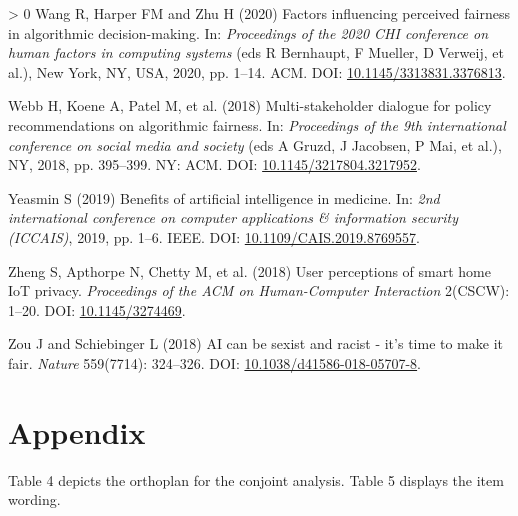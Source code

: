 \documentclass{article}
\newlength{\cslhangindent}
\newenvironment{CSLReferences}[3] %
 {%
  \setlength{\parindent}{0pt}
  \ifodd #1 \everypar{\setlength{\hangindent}{\cslhangindent}}\ignorespaces\fi
  \ifnum #2 > 0
  \setlength{\parskip}{#2\baselineskip}
  \fi
 }%
 {}
\begin{document}
\begin{CSLReferences}{1}{0}
\leavevmode\hypertarget{ref-Wang.2020}{}%
Wang R, Harper FM and Zhu H (2020) Factors influencing perceived
fairness in algorithmic decision-making. In: \emph{Proceedings of the
2020 CHI conference on human factors in computing systems} (eds R
Bernhaupt, F Mueller, D Verweij, et al.), New York, NY, USA, 2020, pp.
1--14. ACM. DOI:
\href{https://doi.org/10.1145/3313831.3376813}{10.1145/3313831.3376813}.

\leavevmode\hypertarget{ref-Webb.2018}{}%
Webb H, Koene A, Patel M, et al. (2018) Multi-stakeholder dialogue for
policy recommendations on algorithmic fairness. In: \emph{Proceedings of
the 9th international conference on social media and society} (eds A
Gruzd, J Jacobsen, P Mai, et al.), NY, 2018, pp. 395--399. {NY: ACM}.
DOI:
\href{https://doi.org/10.1145/3217804.3217952}{10.1145/3217804.3217952}.

\leavevmode\hypertarget{ref-Yeasmin.2019}{}%
Yeasmin S (2019) Benefits of artificial intelligence in medicine. In:
\emph{2nd international conference on computer applications {\&}
information security (ICCAIS)}, 2019, pp. 1--6. IEEE. DOI:
\href{https://doi.org/10.1109/CAIS.2019.8769557}{10.1109/CAIS.2019.8769557}.

\leavevmode\hypertarget{ref-Zheng.2018}{}%
Zheng S, Apthorpe N, Chetty M, et al. (2018) User perceptions of smart
home IoT privacy. \emph{Proceedings of the ACM on Human-Computer
Interaction} 2(CSCW): 1--20. DOI:
\href{https://doi.org/10.1145/3274469}{10.1145/3274469}.

\leavevmode\hypertarget{ref-Zou.2018}{}%
Zou J and Schiebinger L (2018) AI can be sexist and racist - it's time
to make it fair. \emph{Nature} 559(7714): 324--326. DOI:
\href{https://doi.org/10.1038/d41586-018-05707-8}{10.1038/d41586-018-05707-8}.

\end{CSLReferences}

\hypertarget{appendix}{%
\section*{Appendix}\label{appendix}}

Table 4 depicts the orthoplan for the conjoint analysis. Table 5
displays the item wording.
\end{document}
